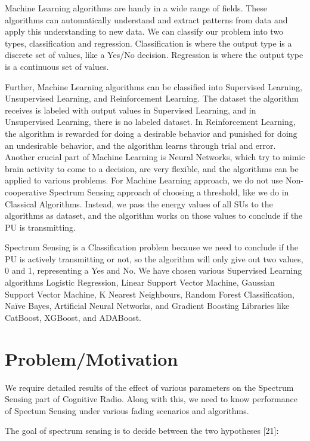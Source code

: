 Machine Learning algorithms are handy in a wide range of fields. These algorithms can automatically understand and extract patterns from data and apply this understanding to new data. We can classify our problem into two types, classification and regression. Classification is where the output type is a discrete set of values, like a Yes/No decision. Regression is where the output type is a continuous set of values.

Further, Machine Learning algorithms can be classified into Supervised Learning, Unsupervised Learning, and Reinforcement Learning. The dataset the algorithm receives is labeled with output values in Supervised Learning, and in Unsupervised Learning, there is no labeled dataset. In Reinforcement Learning, the algorithm is rewarded for doing a desirable behavior and punished for doing an undesirable behavior, and the algorithm learns through trial and error. Another crucial part of Machine Learning is Neural Networks, which try to mimic brain activity to come to a decision, are very flexible, and the algorithms can be applied to various problems.
For Machine Learning approach, we do not use Non-cooperative Spectrum Sensing approach of choosing a threshold, like we do in Classical Algorithms. Instead, we pass the energy values of all SUs to the algorithms as dataset, and the algorithm works on those values to conclude if the PU is transmitting.

Spectrum Sensing is a Classification problem because we need to conclude if the PU is actively transmitting or not, so the algorithm will only give out two values, 0 and 1, representing a Yes and No. We have chosen various Supervised Learning algorithms Logistic Regression, Linear Support Vector Machine, Gaussian Support Vector Machine, K Nearest Neighbours, Random Forest Classification, Naïve Bayes, Artificial Neural Networks, and Gradient Boosting Libraries like CatBoost, XGBoost, and ADABoost. 






\section{Problem/Motivation}
We require detailed results of the effect of various parameters on the Spectrum Sensing part of Cognitive Radio. Along with this, we need to know performance of Spectum Sensing under various fading scenarios and algorithms. 

The goal of spectrum sensing is to decide between the two hypotheses [21]:
 
